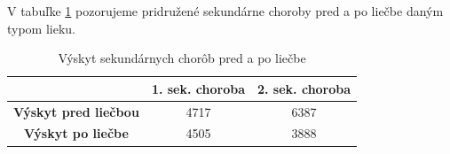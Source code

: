 V tabuľke \ref{tab:sekundarne} pozorujeme pridružené sekundárne choroby pred a po liečbe daným typom lieku.

\begin{table}[h!]
\centering
\begin{tabular}{c|cc}
\hline
                             & \textbf{1. sek. choroba} & \textbf{2. sek. choroba} \\ \hline
\textbf{Výskyt pred liečbou} & 4717                             & 6387                              \\ \hline
\textbf{Výskyt po liečbe}    & 4505                             & 3888                              \\ \hline
\end{tabular}
\caption{Výskyt sekundárnych chorôb pred a po liečbe}
\label{tab:sekundarne}
\end{table}





























